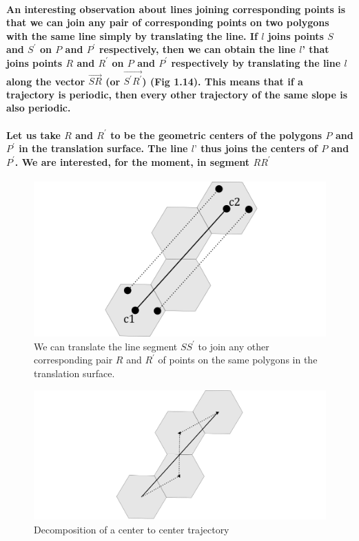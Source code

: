 \documentclass{report}
\begin{document}
\paragraph{An interesting observation about lines joining corresponding points is that we can join any pair of corresponding points on two polygons with the same line simply by translating the line. If $l$ joins points $S$ and $S^\prime$ on $P$ and $P^\prime$ respectively, then we can obtain the line $l$' that joins points $R$ and $R^\prime$ on $P$ and $P^\prime$ respectively by translating the line $l$ along the vector $\vec{{SR}}$ (or $\vec{{S^\prime R^\prime}}$) (Fig 1.14). This means that if a trajectory is periodic, then every other trajectory of the same slope is also periodic.}

\paragraph{Let us take $R$ and $R^\prime$ to be the geometric centers of the polygons $P$ and $P^\prime$ in the translation surface. The line $l’$ thus joins the centers of $P$ and $P^\prime$. We are interested, for the moment, in segment $RR^\prime$}


\begin{figure} 
\begin{center}
\includegraphics[scale=0.3]{12}
\caption{We can translate the line segment $SS^\prime$ to join any other corresponding pair $R$ and $R^\prime$ of points on the same polygons in the translation surface. }
\end{center}
\end{figure}


\begin{figure} 
\begin{center}
\includegraphics[scale=0.3]{11}
\caption{Decomposition of a center to center trajectory}
\end{center}
\end{figure}
\end{document}
